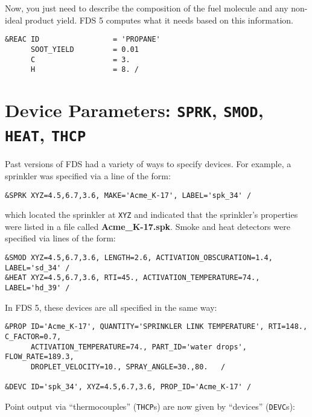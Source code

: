 \documentclass[11pt]{book}
\newcommand{\ct}{\tt\small}
\begin{document}
\noindent
Now, you just need to describe the composition of the fuel molecule and any non-ideal product yield. FDS 5 computes what it needs based on
this information.

\footnotesize
\begin{verbatim}
&REAC ID                 = 'PROPANE'
      SOOT_YIELD         = 0.01
      C                  = 3.
      H                  = 8. /
\end{verbatim}
\normalsize


\section{Device Parameters: \texorpdfstring{{\tt SPRK}}{SPRK}, \texorpdfstring{{\tt SMOD}}{SMOD},
\texorpdfstring{{\tt HEAT}}{HEAT}, \texorpdfstring{{\tt THCP}}{THCP}}

Past versions of FDS had a variety of ways to specify devices. For example, a sprinkler was specified via a line of the form:

\footnotesize
\begin{verbatim}
&SPRK XYZ=4.5,6.7,3.6, MAKE='Acme_K-17', LABEL='spk_34' /
\end{verbatim} \normalsize

\noindent
which located the sprinkler at {\ct XYZ} and indicated that the sprinkler's properties were listed in a file called {\bf Acme\_K-17.spk}.
Smoke and heat detectors were specified via lines of the form:

\footnotesize
\begin{verbatim}
&SMOD XYZ=4.5,6.7,3.6, LENGTH=2.6, ACTIVATION_OBSCURATION=1.4, LABEL='sd_34' /
&HEAT XYZ=4.5,6.7,3.6, RTI=45., ACTIVATION_TEMPERATURE=74., LABEL='hd_39' /
\end{verbatim} \normalsize

\noindent
In FDS 5, these devices are all specified in the same way:

\footnotesize
\begin{verbatim}
&PROP ID='Acme_K-17', QUANTITY='SPRINKLER LINK TEMPERATURE', RTI=148., C_FACTOR=0.7,
      ACTIVATION_TEMPERATURE=74., PART_ID='water drops', FLOW_RATE=189.3,
      DROPLET_VELOCITY=10., SPRAY_ANGLE=30.,80.   /

&DEVC ID='spk_34', XYZ=4.5,6.7,3.6, PROP_ID='Acme_K-17' /
\end{verbatim} \normalsize

\noindent
Point output via ``thermocouples'' ({\ct THCP}s) are now given by ``devices'' ({\ct DEVC}s):
\end{document}
